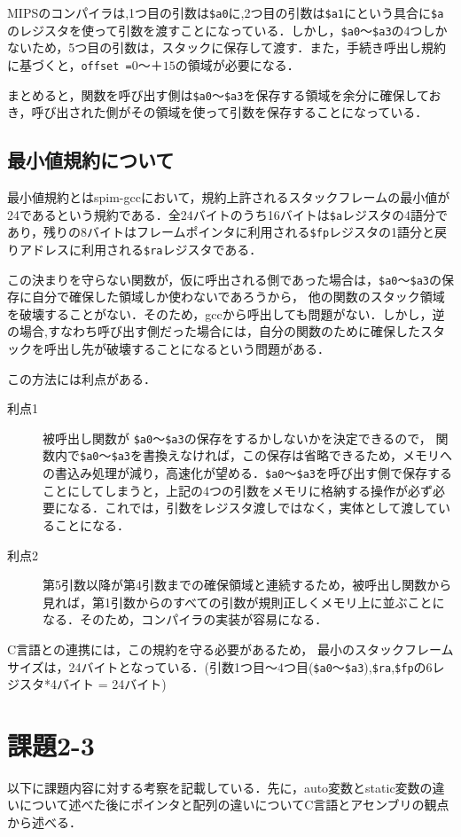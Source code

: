 \documentclass[a4j,11pt]{jarticle}
\begin{document}
MIPSのコンパイラは,1つ目の引数は\verb|$a0|に,2つ目の引数は\verb|$a1|にという具合に\verb|$a|のレジスタを使って引数を渡すことになっている．しかし，\verb|$a0|〜\verb|$a3|の4つしかないため，5つ目の引数は，スタックに保存して渡す．また，手続き呼出し規約に基づくと，\verb|offset =|$0$〜＋$15$の領域が必要になる．

まとめると，関数を呼び出す側は\verb|$a0|〜\verb|$a3|を保存する領域を余分に確保しておき，呼び出された側がその領域を使って引数を保存することになっている．

\subsection{最小値規約について}
最小値規約とはspim-gccにおいて，規約上許されるスタックフレームの最小値が24であるという規約である．全24バイトのうち16バイトは\verb|$a|レジスタの4語分であり，残りの8バイトはフレームポインタに利用される\verb|$fp|レジスタの1語分と戻りアドレスに利用される\verb|$ra|レジスタである．

この決まりを守らない関数が，仮に呼出される側であった場合は，\verb|$a0|〜\verb|$a3|の保存に自分で確保した領域しか使わないであろうから， 他の関数のスタック領域を破壊することがない．そのため，gccから呼出しても問題がない．しかし，逆の場合,すなわち呼び出す側だった場合には，自分の関数のために確保したスタックを呼出し先が破壊することになるという問題がある．

この方法には利点がある．
\begin{description}
\item[利点1]被呼出し関数が \verb|$a0|〜\verb|$a3|の保存をするかしないかを決定できるので， 関数内で\verb|$a0|〜\verb|$a3|を書換えなければ，この保存は省略できるため，メモリへの書込み処理が減り，高速化が望める．\verb|$a0|〜\verb|$a3|を呼び出す側で保存することにしてしまうと，上記の4つの引数をメモリに格納する操作が必ず必要になる．これでは，引数をレジスタ渡しではなく，実体として渡していることになる．
\item[利点2]第5引数以降が第4引数までの確保領域と連続するため，被呼出し関数から見れば，第1引数からのすべての引数が規則正しくメモリ上に並ぶことになる．そのため，コンパイラの実装が容易になる．
\end{description}
C言語との連携には，この規約を守る必要があるため， 最小のスタックフレームサイズは，24バイトとなっている．(引数1つ目〜4つ目(\verb|$a0|〜\verb|$a3|),\verb|$ra|,\verb|$fp|の6レジスタ*4バイト = 24バイト) 
 \section{課題2-3}
以下に課題内容に対する考察を記載している．先に，auto変数とstatic変数の違いについて述べた後にポインタと配列の違いについてC言語とアセンブリの観点から述べる．
\end{document}
